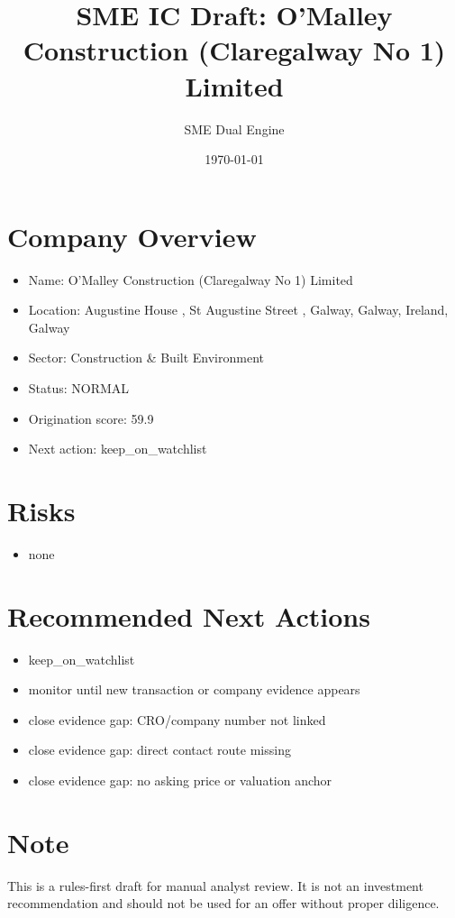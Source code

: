 \documentclass[11pt,a4paper]{article}
\title{SME IC Draft: O'Malley Construction (Claregalway No 1) Limited}
\author{SME Dual Engine}
\date{\today}
\begin{document}
\maketitle
\section*{Company Overview}
\begin{itemize}[leftmargin=1.4em]
\item Name: O'Malley Construction (Claregalway No 1) Limited
\item Location: Augustine House , St Augustine Street , Galway, Galway, Ireland, Galway
\item Sector: Construction \& Built Environment
\item Status: NORMAL
\item Origination score: 59.9
\item Next action: keep\_on\_watchlist
\end{itemize}
\section*{Risks}
\begin{itemize}[leftmargin=1.4em]
\item none
\end{itemize}
\section*{Recommended Next Actions}
\begin{itemize}[leftmargin=1.4em]
\item keep\_on\_watchlist
\item monitor until new transaction or company evidence appears
\item close evidence gap: CRO/company number not linked
\item close evidence gap: direct contact route missing
\item close evidence gap: no asking price or valuation anchor
\end{itemize}
\section*{Note}
This is a rules-first draft for manual analyst review. It is not an investment
recommendation and should not be used for an offer without proper diligence.
\end{document}
